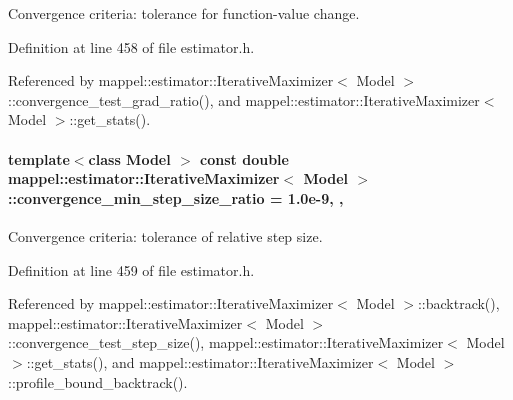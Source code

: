 Convergence criteria\+: tolerance for function-\/value change. 



Definition at line 458 of file estimator.\+h.



Referenced by mappel\+::estimator\+::\+Iterative\+Maximizer$<$ Model $>$\+::convergence\+\_\+test\+\_\+grad\+\_\+ratio(), and mappel\+::estimator\+::\+Iterative\+Maximizer$<$ Model $>$\+::get\+\_\+stats().

\paragraph[{\texorpdfstring{convergence\+\_\+min\+\_\+step\+\_\+size\+\_\+ratio}{convergence_min_step_size_ratio}}]{\setlength{\rightskip}{0pt plus 5cm}template$<$class Model $>$ const double {\bf mappel\+::estimator\+::\+Iterative\+Maximizer}$<$ Model $>$\+::convergence\+\_\+min\+\_\+step\+\_\+size\+\_\+ratio = 1.\+0e-\/9\hspace{0.3cm}{\ttfamily [static]}, {\ttfamily [protected]}, {\ttfamily [inherited]}}\hypertarget{classmappel_1_1estimator_1_1IterativeMaximizer_a4daa3375ddf2e676980a33630c186f92}{}\label{classmappel_1_1estimator_1_1IterativeMaximizer_a4daa3375ddf2e676980a33630c186f92}


Convergence criteria\+: tolerance of relative step size. 



Definition at line 459 of file estimator.\+h.



Referenced by mappel\+::estimator\+::\+Iterative\+Maximizer$<$ Model $>$\+::backtrack(), mappel\+::estimator\+::\+Iterative\+Maximizer$<$ Model $>$\+::convergence\+\_\+test\+\_\+step\+\_\+size(), mappel\+::estimator\+::\+Iterative\+Maximizer$<$ Model $>$\+::get\+\_\+stats(), and mappel\+::estimator\+::\+Iterative\+Maximizer$<$ Model $>$\+::profile\+\_\+bound\+\_\+backtrack().

